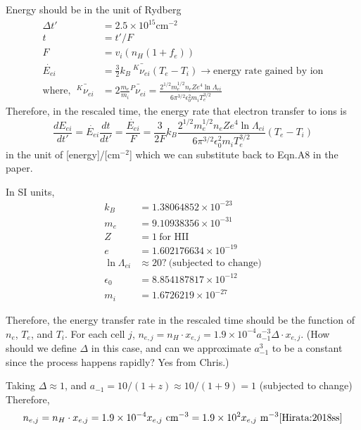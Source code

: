 \documentclass{article}
\begin{document}
Energy should be in the unit of Rydberg
\begin{equation}
\begin{split}
	\Delta t' &= 2.5\times 10^{15} \text{cm}^{-2}\\
	t &= t'/F\\
	F &= v_i(n_H(1+f_e))\\
	\dot{E_{ei}} &= \frac{3}{2}k_B\ \bar{^K\nu_{ei}}(T_e - T_i) \rightarrow \text{energy rate gained by ion}\\
	\text{where},\ \ \bar{^K\nu_{ei}} &= 2\frac{m_e}{m_i} \bar{^P\nu_{ei}} = \frac{2^{1/2}m_e^{1/2}n_eZe^4\ln\Lambda_{ei}}{6\pi^{3/2}\epsilon_0^2m_iT_e^{3/2}}
	\end{split}
\end{equation}
Therefore, in the rescaled time, the energy rate that electron transfer to ions is
\begin{equation}
	\frac{d E_{ei}}{d t'} = \dot{E_{ei}} \frac{dt}{dt'} = \frac{\dot{E_{ei}}}{F} = \frac{3}{2F}k_B\frac{2^{1/2}m_e^{1/2}n_eZe^4\ln\Lambda_{ei}}{6\pi^{3/2}\epsilon_0^2m_iT_e^{3/2}} (T_e - T_i)
\end{equation}
in the unit of [energy]/[cm$^{-2}$] which we can substitute back to Eqn.A8 in the paper.

In SI units,
\begin{equation}
	\begin{split}
		k_B &= 1.38064852 \times 10^{-23}\\
		m_e &= 9.10938356 \times 10^{-31}\\
		Z &= 1\ \text{for HII}\\
		e &= 1.602176634 \times 10^{-19}\\
    	\ln\Lambda_{ei} &\approx 20 ?\ \text{(subjected to change)} \\
    	\epsilon_0 &= 8.854187817 \times 10^{-12}\\
    	m_i &= 1.6726219 \times 10^{-27}
	\end{split}
\end{equation}

Therefore, the energy transfer rate in the rescaled time should be the function of $n_e$, $T_e$, and $T_i$. For each cell $j$, $n_{e,j}=n_H \cdot x_{e,j} = 1.9\times10^{-4}a_{-1}^{-3}\Delta \cdot x_{e,j}$. (How should we define $\Delta$ in this case, and can we approximate $a_{-1}^3$ to be a constant since the process happens rapidly? Yes from Chris.)

Taking $\Delta \approx 1$, and $a_{-1} = 10/(1+z) \approx 10/(1+9) = 1$ (subjected to change) Therefore,
\begin{equation}
	n_{e,j} = n_H \cdot x_{e,j} = 1.9\times10^{-4} x_{e,j}\ \text{cm}^{-3} = 	1.9\times10^{2}  x_{e,j} \ \text{m}^{-3} \cite{Hirata:2018ss}
\end{equation}
\end{document}
